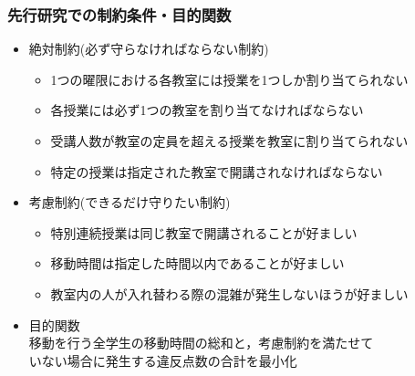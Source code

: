 \documentclass[dvipdfmx,12pt]{beamer}
\begin{document}
\begin{frame}\frametitle{先行研究での制約条件・目的関数}
\begin{itemize}
\item 絶対制約(必ず守らなければならない制約)
\begin{itemize}
\item 1つの曜限における各教室には授業を1つしか割り当てられない
\item 各授業には必ず1つの教室を割り当てなければならない
\item 受講人数が教室の定員を超える授業を教室に割り当てられない
\item 特定の授業は指定された教室で開講されなければならない
\end{itemize}


\item 考慮制約(できるだけ守りたい制約)

\begin{itemize}
\item 特別連続授業は同じ教室で開講されることが好ましい
\item 移動時間は指定した時間以内であることが好ましい
\item 教室内の人が入れ替わる際の混雑が発生しないほうが好ましい
\end{itemize}
\item 目的関数\\
移動を行う全学生の移動時間の総和と，考慮制約を満たせて\\いない場合に発生する違反点数の合計を最小化
\end{itemize}
\end{frame}
\end{document}
